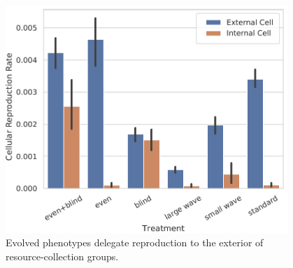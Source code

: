 \begin{figure}
  \begin{columns}
  \begin{column}{0.75\textwidth}
  \includegraphics[width=\textwidth]{img/title=reproductive_labor_surrounded+ext=}
  \end{column}
  \begin{column}{0.25\textwidth}
  \caption{
  Evolved phenotypes delegate reproduction to the exterior of resource-collection groups.
  }
  \label{fig:differentiation}
  \end{column}
  \end{columns}
\end{figure}
